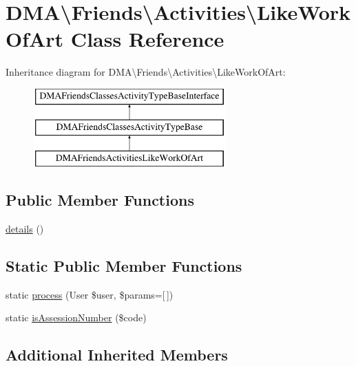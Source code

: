 \hypertarget{classDMA_1_1Friends_1_1Activities_1_1LikeWorkOfArt}{}\section{D\+M\+A\textbackslash{}Friends\textbackslash{}Activities\textbackslash{}Like\+Work\+Of\+Art Class Reference}
\label{classDMA_1_1Friends_1_1Activities_1_1LikeWorkOfArt}
Inheritance diagram for D\+M\+A\textbackslash{}Friends\textbackslash{}Activities\textbackslash{}Like\+Work\+Of\+Art\+:\begin{figure}[H]
\begin{center}
\leavevmode
\includegraphics[height=3.000000cm]{d2/d05/classDMA_1_1Friends_1_1Activities_1_1LikeWorkOfArt}
\end{center}
\end{figure}
\subsection*{Public Member Functions}
\begin{DoxyCompactItemize}
\item 
\hyperlink{classDMA_1_1Friends_1_1Activities_1_1LikeWorkOfArt_ad8755c7d0fc4f34acfabc7716acfd52c}{details} ()
\end{DoxyCompactItemize}
\subsection*{Static Public Member Functions}
\begin{DoxyCompactItemize}
\item 
static \hyperlink{classDMA_1_1Friends_1_1Activities_1_1LikeWorkOfArt_a88d1a454b4389e3116cc1f8a365747cd}{process} (User \$user, \$params=\mbox{[}$\,$\mbox{]})
\item 
static \hyperlink{classDMA_1_1Friends_1_1Activities_1_1LikeWorkOfArt_ac18459839d22721c79df721a6f9b7f8b}{is\+Assession\+Number} (\$code)
\end{DoxyCompactItemize}
\subsection*{Additional Inherited Members}


